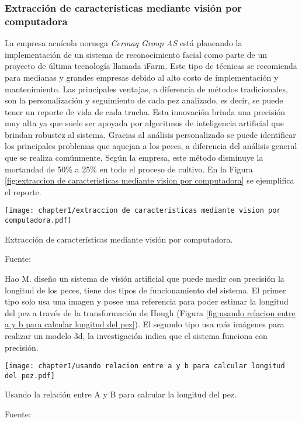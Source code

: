 \subsubsection{Extracción de características mediante visión por computadora}

La empresa acuícola noruega \textit{Cermaq Group AS} está planeando la implementación de un sistema de reconocimiento facial como parte de un proyecto de última tecnología llamada iFarm.\citep{Daley2018} Este tipo de técnicas se recomienda para medianas y grandes empresas debido al alto costo de implementación y mantenimiento. Las principales ventajas, a diferencia de métodos tradicionales, son la personalización y seguimiento de cada pez analizado, es decir, se puede tener un reporte de vida de cada trucha. Esta innovación brinda una precisión muy alta ya que suele ser apoyada por algoritmos de inteligencia artificial que brindan robustez al sistema. Gracias al análisis personalizado se puede identificar los principales problemas que aquejan a los peces, a diferencia del análisis general que se realiza comúnmente. Según la empresa, este método disminuye la mortandad de 50\% a 25\% en todo el proceso de cultivo. En la Figura \ref{fig:extraccion de caracteristicas mediante vision por computadora} se ejemplifica el reporte.

\begin{myfigure}[H]
	\footnotesize\centering
	\texttt{[image: chapter1/extraccion de caracteristicas mediante vision por computadora.pdf]}
	\caption{Extracción de características mediante visión por computadora.}
	\begin{myflushcenter}
		Fuente: \citep{Biosort2016}
	\end{myflushcenter}
	\label{fig:extraccion de caracteristicas mediante vision por computadora}
\end{myfigure}

Hao M. diseño un sistema de visión artificial que puede medir con precisión la longitud de los peces, tiene dos tipos de funcionamiento del sistema. El primer tipo solo usa una imagen y posee una referencia para poder estimar la longitud del pez a través de la transformación de Hough (Figura \ref{fig:usando relacion entre a y b para calcular longitud del pez}). El segundo tipo usa más imágenes para realizar un modelo 3d, la investigación indica que el sistema funciona con precisión. \citep[p.~4-5]{Niu2018}

\begin{myfigure}[H]
	\footnotesize\centering
	\texttt{[image: chapter1/usando relacion entre a y b para calcular longitud del pez.pdf]}
	\caption{Usando la relación  entre A y B para calcular la longitud del pez.}
	\begin{myflushcenter}
		Fuente: \citep{Hao2016}
	\end{myflushcenter}
	\label{fig:usando relacion entre a y b para calcular longitud del pez}
\end{myfigure}

